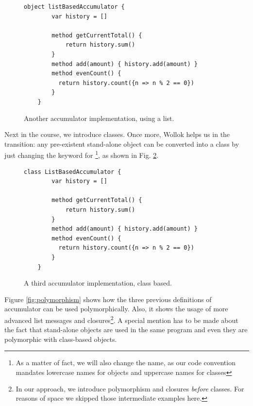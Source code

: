 \vspace{-3mm}
\begin{figure}[ht]
 \centering
 \begin{lstlisting}[language=Wollok]
	object listBasedAccumulator {
		var history = []
		
		method getCurrentTotal() {
			return history.sum()
		}
		method add(amount) { history.add(amount) }
		method evenCount() {
		  return history.count({n => n % 2 == 0})
		}
	}\end{lstlisting}
\vspace{-3mm}
 \caption{\small Another accumulator implementation, using a list.}
\vspace{-3mm}
 \label{fig:accumulator/list}
\end{figure}

\medskip
Next in the course, we introduce classes.
Once more, Wollok helps us in the transition: any pre-existent stand-alone object can be converted into a class by just changing the keyword  for \footnote{As a matter of fact, we will also change the name, as our code convention mandates lowercase names for objects and uppercase names for classes}, as shown in Fig. \ref{fig:accumulator/classes}.

\begin{figure}[ht]
 \centering
 \begin{lstlisting}[language=Wollok]
	class ListBasedAccumulator {
		var history = []
		
		method getCurrentTotal() { 
			return history.sum() 
		}
		method add(amount) { history.add(amount) }
		method evenCount() { 
		  return history.count({n => n % 2 == 0})
		}
	}\end{lstlisting}
\vspace{-3mm}
\caption{\small A third accumulator implementation, class based.}
\label{fig:accumulator/classes}
\end{figure}

Figure \ref{fig:polymorphism} shows how the three previous definitions of accumulator can be used polymorphically. 
Also, it shows the usage of more advanced list messages and closures\footnote{In our approach, we introduce polymorphism and closures \emph{before} classes. For reasons of space we skipped those intermediate examples here.}.
A special mention has to be made about the fact that stand-alone objects are used in the same program and even they are polymorphic with class-based objects.

